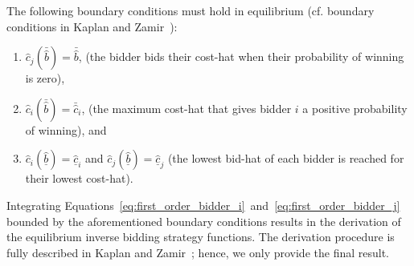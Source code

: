 The following boundary conditions must hold in equilibrium (cf. boundary conditions in Kaplan and Zamir~\cite{KaplanZamir2007}):
\begin{enumerate}
  \item $\hat{c}_j(\bar{\hat{b}}) = \bar{\hat{b}}$, (the bidder bids their cost-hat when their probability of winning is zero),
  \item $\hat{c}_i(\bar{\hat{b}}) = \bar{\hat{c}}_i$, (the maximum cost-hat that gives bidder $i$ a positive probability of winning), and
  \item $\hat{c}_i(\underline{\hat{b}}) = \underline{\hat{c}}_i$ and $\hat{c}_j(\underline{\hat{b}}) = \underline{\hat{c}}_j$ (the lowest bid-hat of each bidder is reached for their lowest cost-hat).
\end{enumerate}
Integrating Equations~\eqref{eq:first_order_bidder_i}~and~\eqref{eq:first_order_bidder_j} bounded by the aforementioned boundary conditions results in the derivation of the equilibrium inverse bidding strategy functions. The derivation procedure is fully described in Kaplan and Zamir~\cite{KaplanZamir2007}; hence, we only provide the final result.
